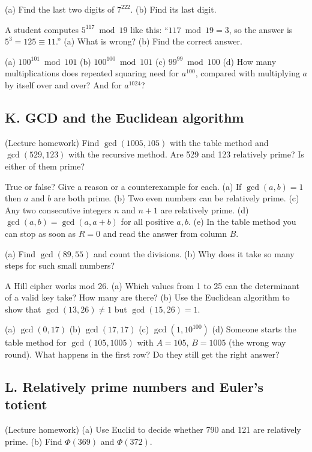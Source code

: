 \q (a) Find the last two digits of $7^{222}$. (b) Find its last digit.

\q A student computes $5^{117} \bmod 19$ like this: ``$117 \bmod 19 = 3$, so the answer is $5^3 = 125 \equiv 11$.''
(a) What is wrong? (b) Find the correct answer.

\q (a) $100^{101} \bmod 101$ \quad (b) $100^{100} \bmod 101$ \quad (c) $99^{99} \bmod 100$
(d) How many multiplications does repeated squaring need for $a^{100}$, compared with multiplying $a$ by itself over and over? And for $a^{1024}$?

\subsection*{K. GCD and the Euclidean algorithm}

\q (Lecture homework) Find $\gcd(1005, 105)$ with the table method and $\gcd(529, 123)$ with the recursive method. Are 529 and 123 relatively prime? Is either of them prime?

\q True or false? Give a reason or a counterexample for each.
(a) If $\gcd(a, b) = 1$ then $a$ and $b$ are both prime.
(b) Two even numbers can be relatively prime.
(c) Any two consecutive integers $n$ and $n + 1$ are relatively prime.
(d) $\gcd(a, b) = \gcd(a, a + b)$ for all positive $a, b$.
(e) In the table method you can stop as soon as $R = 0$ and read the answer from column $B$.

\q (a) Find $\gcd(89, 55)$ and count the divisions. (b) Why does it take so many steps for such small numbers?

\q A Hill cipher works mod 26. (a) Which values from 1 to 25 can the determinant of a valid key take? How many are there?
(b) Use the Euclidean algorithm to show that $\gcd(13, 26) \ne 1$ but $\gcd(15, 26) = 1$.

\q (a) $\gcd(0, 17)$ \quad (b) $\gcd(17, 17)$ \quad (c) $\gcd(1, 10^{100})$
(d) Someone starts the table method for $\gcd(105, 1005)$ with $A = 105$, $B = 1005$ (the wrong way round). What happens in the first row? Do they still get the right answer?

\subsection*{L. Relatively prime numbers and Euler's totient}

\q (Lecture homework) (a) Use Euclid to decide whether 790 and 121 are relatively prime. (b) Find $\Phi(369)$ and $\Phi(372)$.

